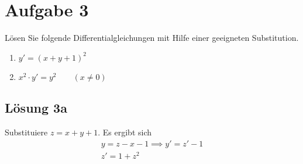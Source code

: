 \documentclass[main.tex]{subfiles}
\begin{document}
\section{Aufgabe 3}
Lösen Sie folgende Differentialgleichungen mit Hilfe einer geeigneten Substitution.
\begin{enumerate}
    \item $y' = (x + y + 1)^2$
    \item $x^2 \cdot y' = y^2 \qquad (x \neq 0)$
\end{enumerate}

\subsection{Lösung 3a}
Substituiere $z = x + y +1$. Es ergibt sich
\begin{align*}
    y = z-x-1 \implies y' = z'-1\\
    z' = 1 + z^2 \\
\end{align*}
\end{document}
